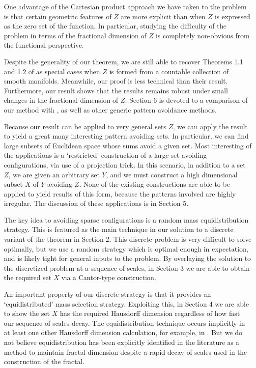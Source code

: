 \documentclass[usenames,dvipsnames]{article}
\theoremstyle{plain}
\theoremstyle{plain}
\begin{document}

One advantage of the Cartesian product approach we have taken to the problem is that certain geometric features of $Z$ are more explicit than when $Z$ is expressed as the zero set of the function. In particular, studying the difficulty of the problem in terms of the fractional dimension of $Z$ is completely non-obvious from the functional perspective.

Despite the generality of our theorem, we are still able to recover Theorems 1.1 and 1.2 of \cite{MalabikaRob} as special cases when $Z$ is formed from a countable collection of smooth manifolds. Meanwhile, our proof is less technical than their result. Furthermore, our result shows that the results remains robust under small changes in the fractional dimension of $Z$. Section 6 is devoted to a comparison of our method with \cite{MalabikaRob}, as well as other generic pattern avoidance methods.

Because our result can be applied to very general sets $Z$, we can apply the result to yield a great many interesting pattern avoiding sets. In particular, we can find large subsets of Euclidean space whose sums avoid a given set. Most interesting of the applications is a `restricted' construction of a large set avoiding configurations, via use of a projection trick. In this scenario, in addition to a set $Z$, we are given an arbitrary set $Y$, and we must construct a high dimensional subset $X$ of $Y$ avoiding $Z$. None of the existing constructions are able to be applied to yield results of this form, because the patterns involved are highly irregular. The discussion of these applications is in Section 5.

The key idea to avoiding sparse configurations is a random mass equidistribution strategy. This is featured as the main technique in our solution to a discrete variant of the theorem in Section 2. This discrete problem is very difficult to solve optimally, but we use a random strategy which is optimal enough in expectation, and is likely tight for general inputs to the problem. By overlaying the solution to the discretized problem at a sequence of scales, in Section 3 we are able to obtain the required set $X$ via a Cantor-type construction.

An important property of our discrete strategy is that it provides an `equidistributed' mass selection strategy. Exploiting this, in Section 4 we are able to show the set $X$ has the required Hausdorff dimension regardless of how fast our sequence of scales decay. The equidistribution technique occurs implicitly in at least one other Hausdorff dimension calculation, for example, in \cite{MalabikaRob}. But we do not believe equidistribution has been explicitly identified in the literature as a method to maintain fractal dimension despite a rapid decay of scales used in the construction of the fractal.
\end{document}
